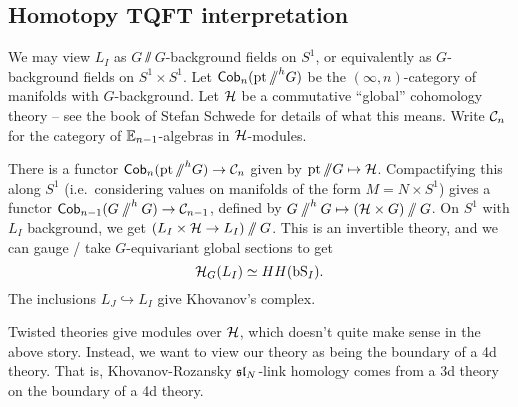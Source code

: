 \subsection{Homotopy TQFT interpretation}

We may view $L_I$ as $G \sslash G$-background fields on $S^1$, or equivalently as $G$-background fields on $S^1 \times S^1$.
Let $\mathsf{Cob}_n(\operatorname{pt} \mathbin{/\mkern-6mu/}^h G)$ be the $(\infty, n)$-category of manifolds with $G$-background.
Let $\mathcal{H}$ be a commutative ``global'' cohomology theory -- see the book of Stefan Schwede for details of what this means.
Write $\mathcal{C}_n$ for the category of $\mathbb{E}_{n-1}$-algebras in $\mathcal{H}$-modules.

There is a functor $\mathsf{Cob}_n(\operatorname{pt} \mathbin{/\mkern-6mu/}^h G) \to \mathcal{C}_n$ given by $\operatorname{pt} \mathbin{/\mkern-6mu/} G \mapsto \mathcal{H}$.
Compactifying this along $S^1$ (i.e.\ considering values on manifolds of the form $M = N \times S^1$) gives a functor $\mathsf{Cob}_{n-1}(G \mathbin{/\mkern-6mu/}^h G) \to \mathcal{C}_{n-1}$, defined by $G \mathbin{/\mkern-6mu/}^h G \mapsto (\mathcal{H} \times G) \mathbin{/\mkern-6mu/} G$.
On $S^1$ with $L_I$ background, we get $(L_I \times \mathcal{H} \to L_I) \mathbin{/\mkern-6mu/} G$.
This is an invertible theory, and we can gauge / take $G$-equivariant global sections to get
\[
	\mathcal{H}_G(L_I) \simeq HH(\mathrm{bS}_I).
\]
The inclusions $L_J \hookrightarrow L_I$ give Khovanov's complex.

Twisted theories give modules over $\mathcal{H}$, which doesn't quite make sense in the above story.
Instead, we want to view our theory as being the boundary of a 4d theory.
That is, Khovanov-Rozansky $\mathfrak{sl}_N$-link homology comes from a 3d theory on the boundary of a 4d theory.
